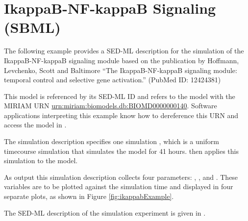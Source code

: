 \section{IkappaB-NF-kappaB Signaling (SBML)}
The following example provides a SED-ML description for the simulation of the IkappaB-NF-kappaB signaling module based on the publication by Hoffmann, Levchenko, Scott and  Baltimore ``The IkappaB-NF-kappaB signaling module: temporal control and selective gene activation.'' (PubMed ID: 12424381)

This model is referenced by its SED-ML ID  and refers to the model with the MIRIAM URN \url{urn:miriam:biomodels.db:BIOMD0000000140}. 
Software applications interpreting this example know how to dereference this URN and access the model in \biom \citep{N+06}.

The simulation description specifies one simulation , which is a uniform timecourse simulation that simulates the model for 41 hours.  then applies this simulation to the model. 

As output this simulation description collects four parameters: , ,  and . These variables are to be plotted against the simulation time and displayed in four separate plots, as shown in Figure \ref{fig:ikappabExample}. 


The SED-ML description of the simulation experiment is given in .




